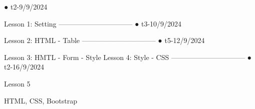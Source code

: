 ● t2-9/9/2024

Lesson 1: Setting
--------------------------------   
    ● t3-10/9/2024

Lesson 2: HTML - Table
--------------------------------
    ● t5-12/9/2024

Lesson 3: HMTL - Form - Style
Lesson 4: Style - CSS
--------------------------------
    ● t2-16/9/2024

Lesson 5





HTML, CSS, Bootstrap
